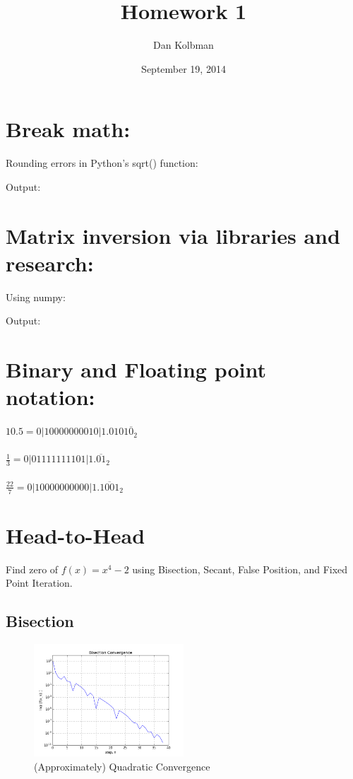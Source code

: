 \documentclass[12pt]{article}
\title{Homework 1}
\author{Dan Kolbman}
\date{September 19, 2014}
\begin{document}
  
  \maketitle
 
  \section{Break math:}
  Rounding errors in Python's sqrt() function:
  
  Output:
  
  
  \clearpage

  \section{Matrix inversion via libraries and research:}
  Using numpy:
  
  Output:
  
  
  \section{Binary and Floating point notation:}
  $10.5 =         0|10000000010|1.0101\overline{0}_2$\\\\
  $\frac{1}{3} =  0|01111111101|1.\overline{01}_2$\\\\
  $\frac{22}{7} = 0|10000000000|1.\overline{1001}_2$
  
  \clearpage

  \section{Head-to-Head}
  Find zero of $f(x) = x^4 - 2$ using Bisection, Secant, False Position,
  and Fixed Point Iteration.

  \subsection{Bisection}
  
  \begin{figure}[h!]
    \centering
    \includegraphics[width=0.5\textwidth]{Problem4a.png}
    \caption{(Approximately) Quadratic Convergence}
  \end{figure}
\end{document}
